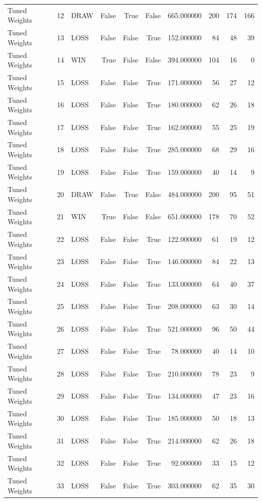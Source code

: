 \begin{table}[htbp]
\begin{tabular}{lrlrrrrrrr}
Tuned Weights & 12 & DRAW & False & True & False & 665.000000 & 200 & 174 & 166 \\
Tuned Weights & 13 & LOSS & False & False & True & 152.000000 & 84 & 48 & 39 \\
Tuned Weights & 14 & WIN & True & False & False & 394.000000 & 104 & 16 & 0 \\
Tuned Weights & 15 & LOSS & False & False & True & 171.000000 & 56 & 27 & 12 \\
Tuned Weights & 16 & LOSS & False & False & True & 180.000000 & 62 & 26 & 18 \\
Tuned Weights & 17 & LOSS & False & False & True & 162.000000 & 55 & 25 & 19 \\
Tuned Weights & 18 & LOSS & False & False & True & 285.000000 & 68 & 29 & 16 \\
Tuned Weights & 19 & LOSS & False & False & True & 159.000000 & 40 & 14 & 9 \\
Tuned Weights & 20 & DRAW & False & True & False & 484.000000 & 200 & 95 & 51 \\
Tuned Weights & 21 & WIN & True & False & False & 651.000000 & 178 & 70 & 52 \\
Tuned Weights & 22 & LOSS & False & False & True & 122.000000 & 61 & 19 & 12 \\
Tuned Weights & 23 & LOSS & False & False & True & 146.000000 & 84 & 22 & 13 \\
Tuned Weights & 24 & LOSS & False & False & True & 133.000000 & 64 & 40 & 37 \\
Tuned Weights & 25 & LOSS & False & False & True & 208.000000 & 63 & 30 & 14 \\
Tuned Weights & 26 & LOSS & False & False & True & 521.000000 & 96 & 50 & 44 \\
Tuned Weights & 27 & LOSS & False & False & True & 78.000000 & 40 & 14 & 10 \\
Tuned Weights & 28 & LOSS & False & False & True & 210.000000 & 78 & 23 & 9 \\
Tuned Weights & 29 & LOSS & False & False & True & 134.000000 & 47 & 23 & 16 \\
Tuned Weights & 30 & LOSS & False & False & True & 185.000000 & 50 & 18 & 13 \\
Tuned Weights & 31 & LOSS & False & False & True & 214.000000 & 62 & 26 & 18 \\
Tuned Weights & 32 & LOSS & False & False & True & 92.000000 & 33 & 15 & 12 \\
Tuned Weights & 33 & LOSS & False & False & True & 303.000000 & 62 & 35 & 30 \\

\end{tabular}
\end{table}
